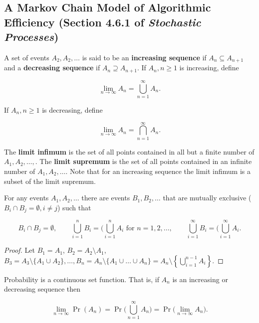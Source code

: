 \subsection{A Markov Chain Model of Algorithmic Efficiency (Section 4.6.1 of \textit{Stochastic Processes})}

\begin{definition}

A set of events \(A_2, A_2, \ldots\) is said to be an \textbf{increasing sequence} if \(A_n \subseteq A_{n+1}\) and a \textbf{decreasing sequence} if \(A_n \supseteq A_{n+1}\). If \(A_n, n \geq 1 \) is increasing, define

\[
\lim_{n \to \infty} A_n = \bigcup_{n=1}^\infty A_n.
\]

If \(A_n, n \geq 1 \) is decreasing, define

\[
\lim_{n \to \infty} A_n = \bigcap_{n=1}^\infty A_n.
\]

The \textbf{limit infimum} is the set of all points contained in all but a finite number of \(A_1, A_2, \ldots,\). The \textbf{limit supremum} is the set of all points contained in an infinite number of \(A_1, A_2, \ldots\). Note that for an increasing sequence the limit infimum is a subset of the limit supremum.

\end{definition}

\begin{lemma}\label{stoch.ross.inclass.simp.lemma}For any events \(A_1, A_2, \ldots\) there are events \(B_1, B_2, \ldots\) that are mutually exclusive (\(B_i \cap B_j = \emptyset, i \neq j\)) such that 

\[
 B_i \cap B_j = \emptyset, \qquad   \bigcup_{i=1}^n B_i = (\bigcup_{i=1}^n A_i \text{ for } n = 1, 2, \ldots , \qquad \bigcup_{i=1}^\infty B_i = (\bigcup_{i=1}^\infty A_i . 
\]

\end{lemma}

\begin{proof}
Let \(B_1 = A_1\), \(B_2 = A_2 \setminus A_1\), \(B_3 = A_3 \setminus \{A_1 \cup A_2\}, \ldots, B_n = A_n \setminus \{A_1 \cup \ldots \cup A_n\} = A_n \setminus \left\{  \bigcup_{i=1}^{n-1} A_i \right\}\).
\end{proof}

\begin{theorem}\label{stoch.prob.set.func}Probability is a continuous set function. That is, if \(A_n\) is an increasing or decreasing sequence then

\[
\lim_{n \to \infty} \Pr(A_n) = \Pr \bigg( \bigcup_{n=1}^\infty A_n \bigg) = \Pr \Big(\lim_{n \to \infty} A_n \Big).
\]

\end{theorem}

